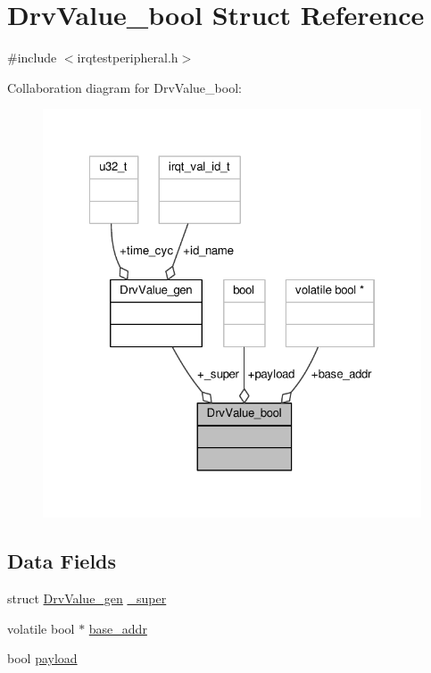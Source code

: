 \hypertarget{struct_drv_value__bool}{}\section{Drv\+Value\+\_\+bool Struct Reference}
\label{struct_drv_value__bool}


{\ttfamily \#include $<$irqtestperipheral.\+h$>$}



Collaboration diagram for Drv\+Value\+\_\+bool\+:\nopagebreak
\begin{figure}[H]
\begin{center}
\leavevmode
\includegraphics[width=322pt]{struct_drv_value__bool__coll__graph}
\end{center}
\end{figure}
\subsection*{Data Fields}
\begin{DoxyCompactItemize}
\item 
struct \hyperlink{struct_drv_value__gen}{Drv\+Value\+\_\+gen} \hyperlink{struct_drv_value__bool_ad6a22febddaa20faa4af2f9fed5766f0}{\+\_\+super}
\item 
volatile bool $\ast$ \hyperlink{struct_drv_value__bool_af9a44b0b9251fbefd04c475aaab792ad}{base\+\_\+addr}
\item 
bool \hyperlink{struct_drv_value__bool_abdbaaae567d94da3de1d6aa546b501ac}{payload}
\end{DoxyCompactItemize}


